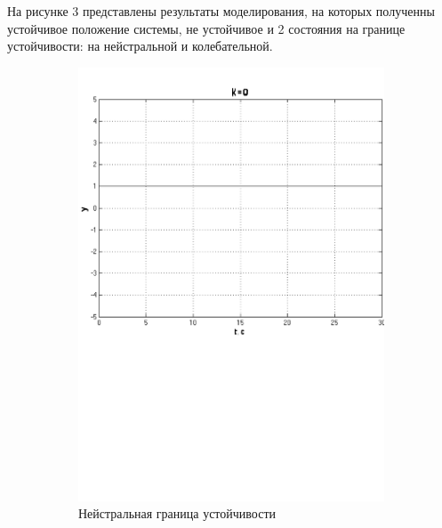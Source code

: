 \documentclass[a4paper, 11pt, russian]{article}
\begin{document}
    На рисунке 3 представлены результаты моделирования, на которых полученны устойчивое положение системы, не устойчивое и 2 состояния на границе устойчивости: на нейстральной и колебательной.
    \begin{figure}[ht!]
        \begin{subfigure}[b]{0.48\textwidth}
            \includegraphics[width = \textwidth]{neutralStabilityLimit}
            \centering
            \caption{Нейстральная граница устойчивости}
        \end{subfigure}
        \hfill
        \begin{subfigure}[b]{0.48\textwidth}

\end{subfigure}
\end{figure}
\end{document}
